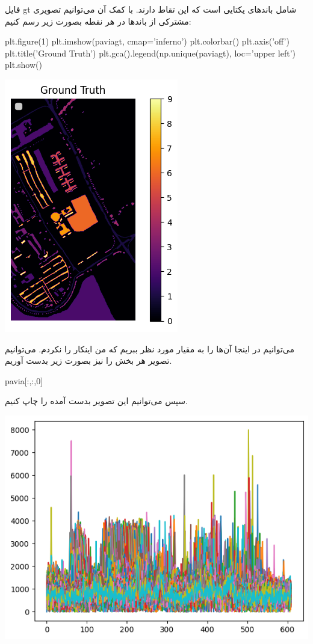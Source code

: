 \documentclass[a4paper, 12pt]{article}
\begin{document}
فایل gt شامل باند‌های یکتایی است که این تقاط دارند. با کمک آن می‌توانیم تصویری مشترکی از باند‌ها در هر نقطه بصورت زیر رسم کنیم:
\begin{latin}
	\begin{python}
plt.figure(1)
plt.imshow(paviagt, cmap='inferno')
plt.colorbar()
plt.axis('off')
plt.title('Ground Truth')
plt.gca().legend(np.unique(paviagt),
	loc='upper left')
plt.show()
	\end{python}
\end{latin}
\begin{center}
		\includegraphics[scale=0.7]{fig8.png}
\end{center}
می‌توانیم در اینجا آن‌ها را به مقیار مورد نظر ببریم که من اینکار را نکردم. می‌توانیم تصویر هر بخش را نیز بصورت زیر بدست آوریم. 
\begin{latin}
	\begin{python}
pavia[:,:,0]
	\end{python}
\end{latin}
سپس می‌توانیم این تصویر بدست آمده را چاپ کنیم.

	\begin{center}
			\includegraphics[scale=0.7]{fig9.png}
	\end{center}
\end{document}
